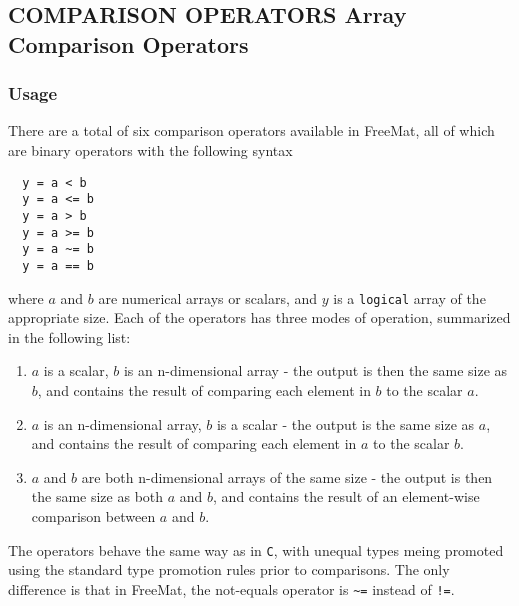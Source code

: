 %
%
%
\subsection{COMPARISON OPERATORS Array Comparison Operators}
\subsubsection{Usage}
There are a total of six comparison operators available in FreeMat, all of which are binary operators with the following syntax
\begin{verbatim}
  y = a < b
  y = a <= b
  y = a > b
  y = a >= b
  y = a ~= b
  y = a == b
\end{verbatim}
where $a$ and $b$ are numerical arrays or scalars, and $y$ is a \verb|logical| array of the appropriate size.  Each of the operators has three modes of operation, summarized in the following list:
\begin{enumerate}
  \item $a$ is a scalar, $b$ is an n-dimensional array - the output is then the same size as $b$, and contains the result of comparing each element in $b$ to the scalar $a$.
  \item $a$ is an n-dimensional array, $b$ is a scalar - the output is the same size as $a$, and contains the result of comparing each element in $a$ to the scalar $b$.
  \item $a$ and $b$ are both n-dimensional arrays of the same size - the output is then the same size as both $a$ and $b$, and contains the result of an element-wise comparison between $a$ and $b$.
\end{enumerate}
The operators behave the same way as in \verb|C|, with unequal types meing promoted using the standard type promotion rules prior to comparisons.  The only difference is that in FreeMat, the not-equals operator is \verb|~=| instead of \verb|!=|.
